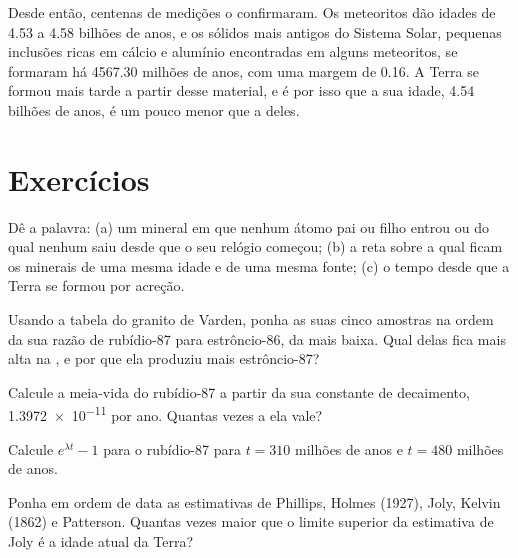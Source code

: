 Desde então, centenas de medições o confirmaram. Os meteoritos dão idades de
4.53 a 4.58 bilhões de anos, e os sólidos mais antigos do Sistema Solar,
pequenas inclusões ricas em cálcio e alumínio encontradas em alguns
meteoritos, se formaram há \num{4567.30} milhões de anos, com uma margem de
0.16. A Terra se formou mais tarde a partir desse material, e é por isso que
a sua idade, 4.54 bilhões de anos, é um pouco menor que a deles.

\section{Exercícios}

\begin{exercise}[$\star$]\label{exo:g12:age-of-the-earth:1}
Dê a palavra: (a) um mineral em que nenhum átomo pai ou filho entrou ou do
qual nenhum saiu desde que o seu relógio começou; (b) a reta sobre a qual
ficam os minerais de uma mesma idade e de uma mesma fonte; (c) o tempo desde
que a Terra se formou por acreção.
\end{exercise}

\begin{exercise}[$\star$]\label{exo:g12:age-of-the-earth:2}
Usando a tabela do granito de Varden, ponha as suas cinco amostras na ordem
da sua razão de rubídio-87 para estrôncio-86, da mais baixa. Qual delas fica
mais alta na , e por que ela produziu mais estrôncio-87?
\end{exercise}

\begin{exercise}[$\star$]\label{exo:g12:age-of-the-earth:3}
Calcule a meia-vida do rubídio-87 a partir da sua constante de decaimento,
\num{1.3972e-11} por ano. Quantas vezes a  ela vale?
\end{exercise}

\begin{exercise}[$\star$]\label{exo:g12:age-of-the-earth:4}
Calcule $e^{\lambda t} - 1$ para o rubídio-87 para $t = 310$ milhões de
anos e $t = 480$ milhões de anos.
\end{exercise}

\begin{exercise}[$\star$]\label{exo:g12:age-of-the-earth:5}
Ponha em ordem de data as estimativas de Phillips, Holmes (1927), Joly,
Kelvin (1862) e Patterson. Quantas vezes maior que o limite superior da
estimativa de Joly é a idade atual da Terra?
\end{exercise}

